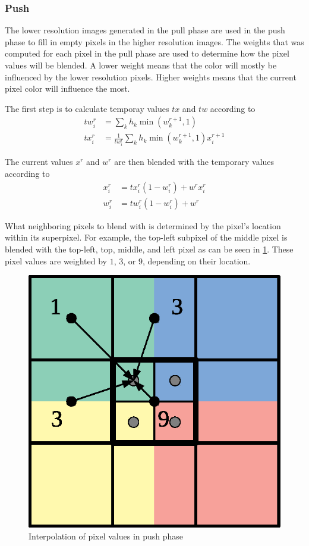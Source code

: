 \begin{subs}
\subsubsection{Push}
The lower resolution images generated in the pull phase are used in the push phase to fill in empty pixels in the higher resolution images. The weights that was computed for each pixel in the pull phase are used to determine how the pixel values will be blended. A lower weight means that the color will mostly be influenced by the lower resolution pixels. Higher weights means that the current pixel color will influence the most.

The first step is to calculate temporay values $tx$ and $tw$ according to
\begin{align}
  tw^{r}_i &= \sum_k {h_k \min(w^{r+1}_k,1)} \label{eq:push_tw}\\
  tx^{r}_i &= \frac{1}{tw^{r}_i} \sum_k {h_k \min(w^{r+1}_k,1) x^{r+1}_i} \label{eq:push_tx}
\end{align}

The current values $x^r$ and $w^r$ are then blended with the temporary values according to
\begin{align}
  x^r_i &= tx^r_i (1 - w^r_i) + w^r x^r_i \label{eq:push_x}\\
  w^r_i &= tw^r_i (1 - w^r_i) + w^r \label{eq:push_w}
\end{align}

What neighboring pixels to blend with is determined by the pixel's location within its superpixel. For example, the top-left subpixel of the middle pixel is blended with the top-left, top, middle, and left pixel as can be seen in \cref{fig:push_filter}. These pixel values are weighted by $1$, $3$, or $9$,  depending on their location.

\begin{figure}[h]
    \centering
    \includegraphics[width=.5\textwidth]{figures/push_filter_color.eps}
    \caption{Interpolation of pixel values in push phase}
    \label{fig:push_filter}
\end{figure}

\end{subs}

